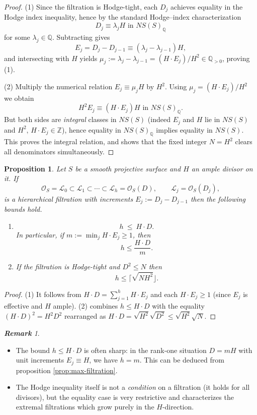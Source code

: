 \documentclass[14pt]{amsart}
\theoremstyle{plain}
\newtheorem{prop}[thm]{\bf Proposition}
\theoremstyle{definition}
\theoremstyle{remark}
\newtheorem{rem}[thm]{\bf Remark}
\theoremstyle{example}
\def \Z{\mathbb{Z}}
\def \Q{\mathbb{Q}}
\def \L{\mathcal{L}}
\def \O{\mathcal{O}}
\begin{document}
\begin{proof}
(1) Since the filtration is Hodge-tight, each $D_j$ achieves equality in the Hodge index inequality, hence by the standard Hodge--index characterization
$$
D_j \equiv \lambda_j H \text{ in }NS(S)_{\Q}
$$
for some $\lambda_j\in\Q$. Subtracting gives
$$
E_j = D_j-D_{j-1} \equiv (\lambda_j-\lambda_{j-1})H,
$$
and intersecting with $H$ yields $\mu_j:=\lambda_j-\lambda_{j-1}=(H\cdot E_j)/H^2\in\Q_{>0}$, proving (1).

(2) Multiply the numerical relation $E_j\equiv\mu_j H$ by $H^2$. Using $\mu_j=(H\cdot E_j)/H^2$ we obtain
$$
H^2 E_j \equiv (H\cdot E_j) H \text{ in }NS(S)_{\Q}.
$$
But both sides are \emph{integral} classes in $NS(S)$ (indeed $E_j$ and $H$ lie in $NS(S)$ and $H^2,\,H\cdot E_j\in\Z$), hence equality in $NS(S)_{\Q}$ implies equality in $NS(S)$. This proves the integral relation, and shows that the fixed integer $N=H^2$ clears all denominators simultaneously.
\end{proof}

\begin{prop}
\label{prop:filtration-bounds}
Let $S$ be a smooth projective surface and $H$ an ample divisor on it. If 
$$\O_S=\L_0\subset\L_1\subset\cdots\subset\L_h=\O_S(D),\qquad \L_j=\O_S(D_j),$$
is a hierarchical filtration with increments $E_j:=D_j-D_{j-1}$ then the following bounds hold.
\begin{enumerate}
\item
$$h \ \le\ H \cdot  D.$$
In particular, if $m:=\min_j H \cdot E_j\geq 1$, then
$$h\leq\frac{H\cdot D}{m}.$$
\item
If the filtration is Hodge-tight and $D^2\leq N$ then
$$h\leq\lceil\sqrt{N H^2}\rfloor.$$
\end{enumerate}
\end{prop}

\begin{proof}
(1) It follows from $H\cdot D=\sum_{j=1}^h H\cdot E_j$ and each $H\cdot E_j\geq 1$
(since $E_j$ is effective and $H$ ample).
(2) combines $h\leq H \cdot D$ with the equality $(H \cdot D)^2=H^2 D^2$
rearranged as $H \cdot D=\sqrt{H^2}\sqrt{D^2}\leq \sqrt{H^2}\sqrt{N}$.
\end{proof}

\begin{rem}
\begin{itemize}
\item The bound $h\le H\cdot D$ is often sharp: in the rank-one situation $D=mH$
with unit increments $E_j\equiv H$, we have $h=m$. This can be deduced from proposition \ref{prop:max-filtration}.
\item The Hodge inequality itself is not a \emph{condition} on a filtration (it holds for all divisors),
but the equality case is very restrictive and characterizes the extremal filtrations which grow purely in the $H$-direction.
\end{itemize}
\end{rem}
\end{document}
